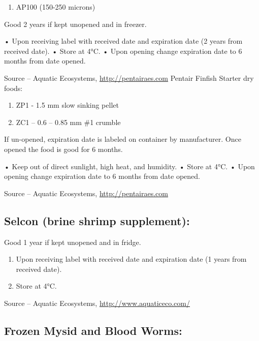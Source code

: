 \documentclass[
]{book}
\providecommand{\tightlist}{%
  \setlength{\itemsep}{0pt}\setlength{\parskip}{0pt}}
\begin{document}
\begin{enumerate}
\def\labelenumi{\arabic{enumi}.}
\tightlist
\item
  AP100 (150-250 microns)
\end{enumerate}

Good 2 years if kept unopened and in freezer.

• Upon receiving label with received date and expiration date (2 years from received date).
• Store at 4°C.
• Upon opening change expiration date to 6 months from date opened.

Source -- Aquatic Ecosystems, \url{http://pentairaes.com}
Pentair Finfish Starter dry foods:

\begin{enumerate}
\def\labelenumi{\arabic{enumi}.}
\setcounter{enumi}{1}
\tightlist
\item
  ZP1 - 1.5 mm slow sinking pellet
\item
  ZC1 -- 0.6 -- 0.85 mm \#1 crumble
\end{enumerate}

If un-opened, expiration date is labeled on container by manufacturer. Once opened the food is good for 6 months.

• Keep out of direct sunlight, high heat, and humidity.
• Store at 4°C.
• Upon opening change expiration date to 6 months from date opened.

Source -- Aquatic Ecosystems, \url{http://pentairaes.com}

\hypertarget{selcon-brine-shrimp-supplement}{%
\subsection{Selcon (brine shrimp supplement):}\label{selcon-brine-shrimp-supplement}}

Good 1 year if kept unopened and in fridge.

\begin{enumerate}
\def\labelenumi{\arabic{enumi}.}
\tightlist
\item
  Upon receiving label with received date and expiration date (1 years from received date).
\item
  Store at 4°C.
\end{enumerate}

Source -- Aquatic Ecosystems, \url{http://www.aquaticeco.com/}

\hypertarget{frozen-mysid-and-blood-worms}{%
\subsection{Frozen Mysid and Blood Worms:}\label{frozen-mysid-and-blood-worms}}
\end{document}
